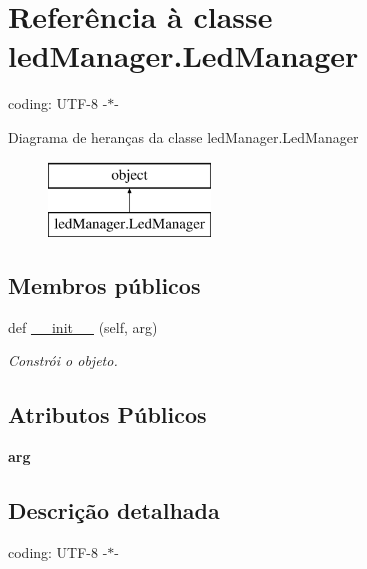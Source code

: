 \hypertarget{classled_manager_1_1_led_manager}{}\section{Referência à classe led\+Manager.\+Led\+Manager}
\label{classled_manager_1_1_led_manager}


coding\+: U\+T\+F-\/8 -\/$\ast$-\/  


Diagrama de heranças da classe led\+Manager.\+Led\+Manager\begin{figure}[H]
\begin{center}
\leavevmode
\includegraphics[height=2.000000cm]{classled_manager_1_1_led_manager}
\end{center}
\end{figure}
\subsection*{Membros públicos}
\begin{DoxyCompactItemize}
\item 
def \hyperlink{classled_manager_1_1_led_manager_a3a48b4b298106eb5cc113d2da0d0ddb1}{\+\_\+\+\_\+init\+\_\+\+\_\+} (self, arg)
\begin{DoxyCompactList}\small\item\em Constrói o objeto. \end{DoxyCompactList}\end{DoxyCompactItemize}
\subsection*{Atributos Públicos}
\begin{DoxyCompactItemize}
\item 
{\bfseries arg}\hypertarget{classled_manager_1_1_led_manager_a647203eaa79b8353cd8efcd22c178f76}{}\label{classled_manager_1_1_led_manager_a647203eaa79b8353cd8efcd22c178f76}

\end{DoxyCompactItemize}


\subsection{Descrição detalhada}
coding\+: U\+T\+F-\/8 -\/$\ast$-\/ 

